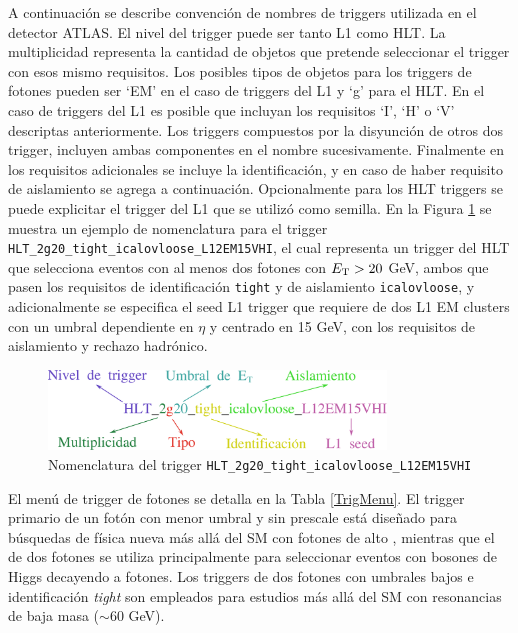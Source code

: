 A continuación se describe convención de nombres de triggers utilizada en el detector ATLAS.
El nivel del trigger puede ser tanto L1 como HLT. La multiplicidad representa la cantidad de objetos que pretende seleccionar el trigger con esos mismo requisitos. Los posibles tipos de objetos para los triggers de fotones pueden ser `EM' en el caso de triggers del L1 y `g' para el HLT. En el caso de triggers del L1 es posible que incluyan los requisitos `I', `H' o `V' descriptas anteriormente. Los triggers compuestos por la disyunción de otros dos trigger, incluyen ambas componentes en el nombre sucesivamente. Finalmente en los requisitos adicionales se incluye la identificación, y en caso de haber requisito de aislamiento se agrega a continuación. Opcionalmente para los HLT triggers se puede explicitar el trigger del L1 que se utilizó como semilla. En la Figura \ref{fig:trigger_name} se muestra un ejemplo de nomenclatura para el trigger \texttt{HLT\_2g20\_tight\_icalovloose\_L12EM15VHI}, el cual representa un trigger del HLT que selecciona eventos con al menos dos fotones con $E_{\text{T}}>20$ GeV, ambos que pasen los requisitos de identificación \texttt{tight} y de aislamiento \texttt{icalovloose}, y adicionalmente se especifica el seed L1 trigger que requiere de dos L1 EM clusters con un umbral dependiente en $\eta$ y centrado en 15 GeV, con los requisitos de aislamiento y rechazo hadrónico.

\begin{figure}
  \centering
  \includegraphics[width=0.8\textwidth]{images/trigger/trigger_name.pdf}
  \caption{Nomenclatura del trigger \texttt{HLT\_2g20\_tight\_icalovloose\_L12EM15VHI}}
  \label{fig:trigger_name}
\end{figure}

El menú de trigger de fotones se detalla en la Tabla \ref{TrigMenu}. El trigger primario de un fotón con menor umbral y sin prescale  está diseñado para búsquedas de física nueva más allá del SM con fotones de alto \ET, mientras que el de dos fotones se utiliza principalmente para seleccionar eventos con bosones de Higgs decayendo a fotones. Los triggers de dos fotones con umbrales bajos e identificación \textit{tight} son empleados para estudios más allá del SM con resonancias de baja masa ($\sim60$ GeV).




